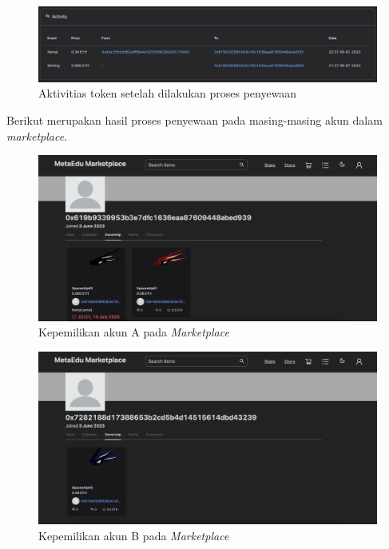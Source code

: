         
  \begin{figure} [H] \centering
            \includegraphics[scale=0.2]{gambar/img-test-integration-rental-history-1.png}
            \caption{Aktivitias token setelah dilakukan proses penyewaan}
            \label{fig:TestIntegrationPurchaseHistory1}
        \end{figure}


Berikut merupakan hasil proses penyewaan pada masing-masing akun dalam \emph{marketplace}.

  \begin{figure} [H] \centering
            \includegraphics[scale=0.2]{gambar/img-test-integration-rental-profile-1.png}
            \caption{Kepemilikan akun A pada \emph{Marketplace}}
            \label{fig:TestIntegrationPurchaseProfile1}
        \end{figure}

  \begin{figure} [H] \centering
            \includegraphics[scale=0.2]{gambar/img-test-integration-rental-profile-2.png}
            \caption{Kepemilikan akun B pada \emph{Marketplace}}
            \label{fig:TestIntegrationPurchaseProfile2}
        \end{figure}
        
